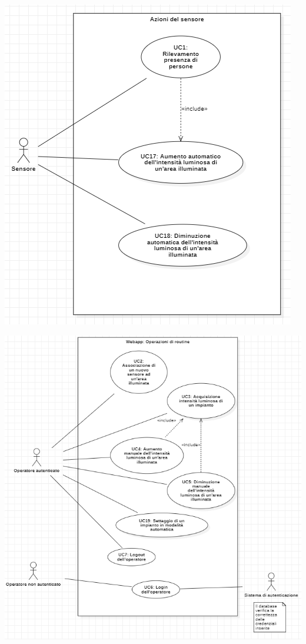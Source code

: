 \documentclass[a4paper, 12pt]{article}
\begin{document}
\includegraphics[scale=0.7]{diagramma_use_case_1.png}

\includegraphics[scale=0.65]{diagramma_use_case_2.png}
\end{document}
